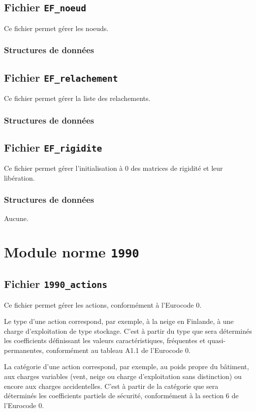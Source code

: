 \documentclass{article}
\begin{document}
\subsection{Fichier {\texttt{EF\_noeud}}}
Ce fichier permet gérer les noeuds.
\subsubsection{Structures de données}


\subsection{Fichier {\texttt{EF\_relachement}}}
Ce fichier permet gérer la liste des relachements.
\subsubsection{Structures de données}


\subsection{Fichier {\texttt{EF\_rigidite}}}
Ce fichier permet gérer l'initialisation à 0 des matrices de rigidité et leur libération.
\subsubsection{Structures de données}
Aucune.

\section{Module norme {\texttt{1990}}}
\subsection{Fichier {\texttt{1990\_actions}}}
Ce fichier permet gérer les actions, conformément à l'Eurocode 0.\par
Le type d'une action correspond, par exemple, à la neige en Finlande, à une charge d'exploitation de type stockage. C'est à partir du type que sera déterminés les coefficients définissant les valeurs caractéristiques, fréquentes et quasi-permanentes, conformément au tableau A1.1 de l'Eurocode 0.\par
La catégorie d'une action correspond, par exemple, au poids propre du bâtiment, aux charges variables (vent, neige ou charge d'exploitation sans distinction) ou encore aux charges accidentelles. C'est à partir de la catégorie que sera déterminés les coefficients partiels de sécurité, conformément à la section 6 de l'Eurocode 0.
\end{document}
